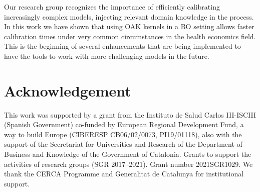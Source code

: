 \documentclass{IOS-Book-Article}
\begin{document}
	Our research group recognizes the importance of efficiently calibrating increasingly complex models, injecting relevant domain knowledge in the process. In this work we have shown that using OAK kernels in a BO setting allows faster calibration times under very common circumstances in the health economics field. This is the beginning of several enhancements that are being implemented to have the tools to work with more challenging models in the future.
	
	\section{Acknowledgement}
	This work was supported by a grant from the Instituto de Salud Carlos III-ISCIII (Spanish Government) co-funded by European Regional Development Fund, a way to build Europe (CIBERESP CB06/02/0073, PI19/01118), also with the support of the Secretariat for Universities and Research of the Department of Business and Knowledge of the Government of Catalonia. Grants to support the activities of research groups (SGR 2017–2021). Grant number 2021SGR1029. We thank the CERCA Programme and Generalitat de Catalunya for institutional support.
	
	
	
\end{document}
